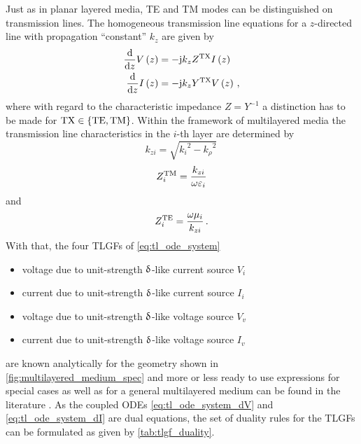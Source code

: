 Just as in planar layered media, \ac{TE} and \ac{TM} modes can be distinguished
on transmission lines.
The homogeneous transmission line equations for a $z$-directed line with
propagation \enquote{constant} $k_z$ are given by
\cite{Felsen1994,Michalski2016b}
\begin{subequations}\label{eq:tl_ode_system}
	\begin{align}
		\frac{\mathrm{d}}{\mathrm{d} z} V\left(z\right)
		&=
		-\mathrm{j} k_z Z^{\mathrm{TX}} I\left(z\right) \label{eq:tl_ode_system_dV} \\
		\frac{\mathrm{d}}{\mathrm{d} z} I\left(z\right)
		&=
		-\mathrm{j} k_z Y^{\mathrm{TX}} V\left(z\right) \label{eq:tl_ode_system_dI} \, ,
	\end{align}
\end{subequations}
where with regard to the characteristic impedance $Z = Y^{-1}$ a distinction has
to be made for $\mathrm{TX} \in \left\{\mathrm{TE},\mathrm{TM}\right\}$.
Within the framework of multilayered media the transmission line
characteristics in the $i$-th layer are determined by
\begin{equation}
	k_{zi} = \sqrt{{k_i}^2 - {k_\rho}^2}
	\,
\end{equation}
\begin{equation}
	Z_i^{\mathrm{TM}} = \frac{k_{zi}}{\omega \varepsilon_i}
\end{equation}
and
\begin{equation}
	Z_i^{\mathrm{TE}} = \frac{\omega \mu_i}{k_{zi}}
	\, .
\end{equation}
With that, the four \acp{TLGF} of \eqref{eq:tl_ode_system}
\begin{itemize}
	\item voltage due to unit-strength $\operatorname{\updelta}$-like current source $V_i$
	\item current due to unit-strength $\operatorname{\updelta}$-like current source $I_i$
	\item voltage due to unit-strength $\operatorname{\updelta}$-like voltage source $V_v$
	\item current due to unit-strength $\operatorname{\updelta}$-like voltage source $I_v$
\end{itemize}
are known analytically for the geometry shown in
\cref{fig:multilayered_medium_spec} and more or less ready to use expressions
for special cases as well as for a general multilayered medium can be found in
the literature 
\cite{Michalski1990,Hsu1993,Ho1994,Eibert1997,Michalski2005}.
As the coupled \acp{ODE} \eqref{eq:tl_ode_system_dV} and
\eqref{eq:tl_ode_system_dI} are dual
equations, the set of duality rules for the \acp{TLGF} can be formulated as
given by \cref{tab:tlgf_duality}.


